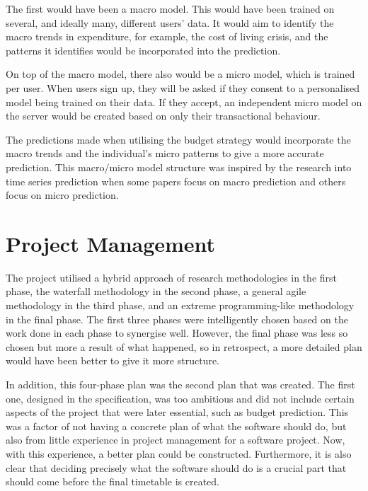 The first would have been a macro model. This would have been trained on several, and ideally many, different users' data. It would aim to identify the macro trends in expenditure, for example, the cost of living crisis, and the patterns it identifies would be incorporated into the prediction.

On top of the macro model, there also would be a micro model, which is trained per user. When users sign up, they will be asked if they consent to a personalised model being trained on their data. If they accept, an independent micro model on the server would be created based on only their transactional behaviour.

The predictions made when utilising the budget strategy would incorporate the macro trends and the individual's micro patterns to give a more accurate prediction. This macro/micro model structure was inspired by the research into time series prediction when some papers focus on macro prediction and others focus on micro prediction.

\section{Project Management}
The project utilised a hybrid approach of research methodologies in the first phase, the waterfall methodology in the second phase, a general agile methodology in the third phase, and an extreme programming-like methodology in the final phase. The first three phases were intelligently chosen based on the work done in each phase to synergise well. However, the final phase was less so chosen but more a result of what happened, so in retrospect, a more detailed plan would have been better to give it more structure.

In addition, this four-phase plan was the second plan that was created. The first one, designed in the specification, was too ambitious and did not include certain aspects of the project that were later essential, such as budget prediction. This was a factor of not having a concrete plan of what the software should do, but also from little experience in project management for a software project. Now, with this experience, a better plan could be constructed. Furthermore, it is also clear that deciding precisely what the software should do is a crucial part that should come before the final timetable is created.